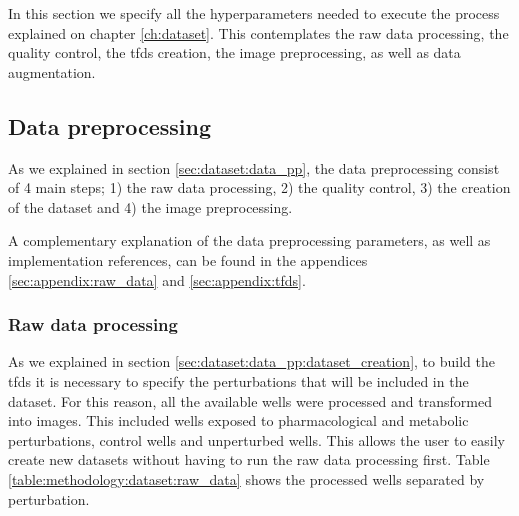 
\glsresetall
\graphicspath{{./Sections/Methodology/Resources/}}

In this section we specify all the hyperparameters needed to execute the process explained on chapter \ref{ch:dataset}. This contemplates the raw data processing, the quality control, the \gls{tfds} creation, the image preprocessing, as well as data augmentation.

\subsection{Data preprocessing}

As we explained in section \ref{sec:dataset:data_pp}, the data preprocessing consist of 4 main steps; 1) the raw data processing, 2) the quality control, 3) the creation of the dataset and 4) the image preprocessing.

A complementary explanation of the data preprocessing parameters, as well as implementation references, can be found in the appendices \ref{sec:appendix:raw_data} and \ref{sec:appendix:tfds}.

\subsubsection{Raw data processing}

As we explained in section \ref{sec:dataset:data_pp:dataset_creation}, to build the \gls{tfds} it is necessary to specify the perturbations that will be included in the dataset. For this reason, all the available wells were processed and transformed into images. This included wells exposed to pharmacological and metabolic perturbations, control wells and unperturbed wells. This allows the user to easily create new datasets without having to run the raw data processing first. Table \ref{table:methodology:dataset:raw_data} shows the processed wells separated by perturbation.


